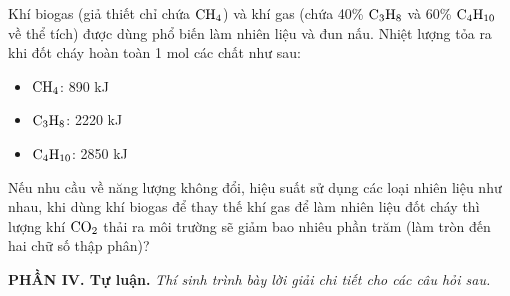 \documentclass[12pt,a4paper]{article}
\begin{document}
\begin{ex}
Khí biogas (giả thiết chỉ chứa $\ce{CH4}$) và khí gas (chứa 40\% $\ce{C3H8}$ và 60\% $\ce{C4H10}$ về thể tích) được dùng phổ biến làm nhiên liệu và đun nấu. Nhiệt lượng tỏa ra khi đốt cháy hoàn toàn 1 mol các chất như sau:
\begin{itemize}
    \setlength\itemsep{0pt}
    \item $\ce{CH4}$: 890 kJ
    \item $\ce{C3H8}$: 2220 kJ
    \item $\ce{C4H10}$: 2850 kJ
\end{itemize}
Nếu nhu cầu về năng lượng không đổi, hiệu suất sử dụng các loại nhiên liệu như nhau, khi dùng khí biogas để thay thế khí gas để làm nhiên liệu đốt cháy thì lượng khí $\ce{CO2}$ thải ra môi trường sẽ giảm bao nhiêu phần trăm (làm tròn đến hai chữ số thập phân)?
\end{ex}

\vspace{0.3cm}
\noindent\textbf{\large PHẦN IV. Tự luận.}
\textit{Thí sinh trình bày lời giải chi tiết cho các câu hỏi sau.}
\vspace{0.2cm}
\end{document}
